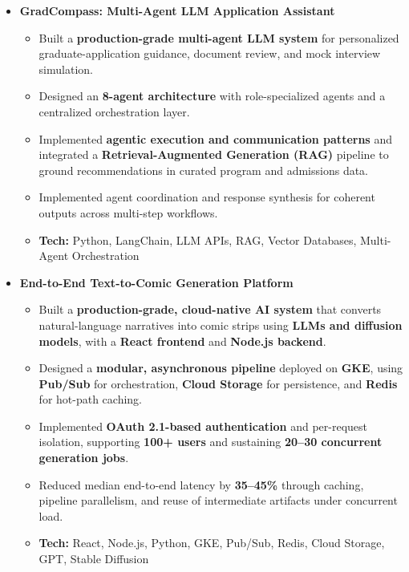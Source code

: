 \documentclass[a4paper,11pt]{article}
\begin{document}
\begin{itemize}
\item \textbf{GradCompass: Multi-Agent LLM Application Assistant}
\begin{itemize}[nosep, after=\strut, leftmargin=1.2em, itemsep=2pt]
    \item Built a \textbf{production-grade multi-agent LLM system} for personalized graduate-application guidance, document review, and mock interview simulation.
    \item Designed an \textbf{8-agent architecture} with role-specialized agents and a centralized orchestration layer.
    \item Implemented \textbf{agentic execution and communication patterns} and integrated a \textbf{Retrieval-Augmented Generation (RAG)} pipeline to ground recommendations in curated program and admissions data.
    \item Implemented agent coordination and response synthesis for coherent outputs across multi-step workflows.
    \item \textbf{Tech:} Python, LangChain, LLM APIs, RAG, Vector Databases, Multi-Agent Orchestration
\end{itemize}

\item \textbf{End-to-End Text-to-Comic Generation Platform}
\begin{itemize}[nosep, after=\strut, leftmargin=1.2em, itemsep=2pt]
    \item Built a \textbf{production-grade, cloud-native AI system} that converts natural-language narratives into comic strips using \textbf{LLMs and diffusion models}, with a \textbf{React frontend} and \textbf{Node.js backend}.
    \item Designed a \textbf{modular, asynchronous pipeline} deployed on \textbf{GKE}, using \textbf{Pub/Sub} for orchestration, \textbf{Cloud Storage} for persistence, and \textbf{Redis} for hot-path caching.
    \item Implemented \textbf{OAuth 2.1-based authentication} and per-request isolation, supporting \textbf{100+ users} and sustaining \textbf{20--30 concurrent generation jobs}.
    \item Reduced median end-to-end latency by \textbf{35--45\%} through caching, pipeline parallelism, and reuse of intermediate artifacts under concurrent load.
    \item \textbf{Tech:} React, Node.js, Python, GKE, Pub/Sub, Redis, Cloud Storage, GPT, Stable Diffusion
\end{itemize}



\end{itemize}
\end{document}
